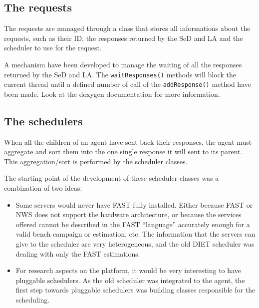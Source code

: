 \subsection{The requests}

The requests are managed through a class that stores all informations
about the requests, such as their ID, the responses returned by the SeD and LA
and the scheduler to use for the request.

A mechanism have been developed to manage the waiting of all the responses
returned by the SeD and LA. The \texttt{waitResponses()} methods will block the
current thread until a defined number of call of the \texttt{addResponse()}
method have been made. Look at the doxygen documentation for more information.


\subsection{The schedulers}

When all the children of an agent have sent back their responses, the agent must
aggregate and sort them into the one single response it will sent to its parent.
This aggregation/sort is performed by the scheduler classes.

The starting point of the development of these scheduler classes was a
combination of two ideas:
\begin{itemize}
\item Some servers would never have FAST fully installed. Either because FAST or
  NWS does not support the hardware architecture, or because the services
  offered cannot be described in the FAST ``language'' accurately enough for a
  valid bench campaign or estimation, etc. The information that the servers can
  give to the scheduler are very heterogeneous, and the old DIET scheduler was
  dealing with only the FAST estimations.
\item For research aspects on the platform, it would be very interesting to
  have pluggable schedulers. As the old scheduler was integrated to the agent,
  the first step towards pluggable schedulers was building classes responsible
  for the scheduling.
\end{itemize}

